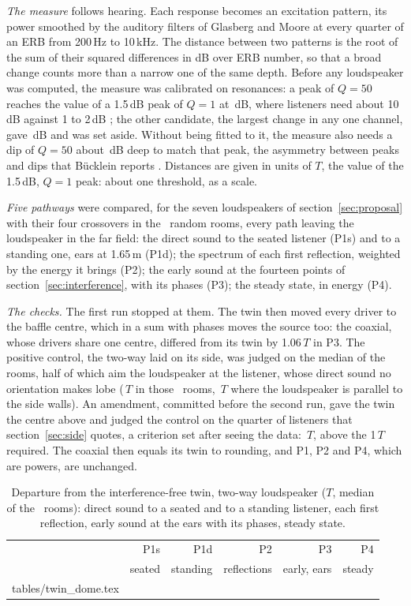 \documentclass[11pt,a4paper]{article}
\makeatletter
\newcommand{\rows}[1]{\@@input tables/#1.tex }
\makeatother
\begin{document}
\emph{The measure} follows hearing. Each response becomes an excitation pattern, its power smoothed by
the auditory filters of Glasberg and Moore \cite{glasberg1990} at every quarter of an ERB from 200\,Hz to
10\,kHz. The distance between two patterns is the root of the sum of their squared differences in dB
over ERB number, so that a broad change counts more than a narrow one of the same depth. Before any
loudspeaker was computed, the measure was calibrated on resonances: a peak of $Q = 50$ reaches the value
of a 1.5\,dB peak of $Q = 1$ at \nslLfiftyA\,dB, where listeners need about 10\,dB against 1 to 2\,dB
\cite{toole1988}; the other candidate, the largest change in any one channel, gave \nslLfiftyB\,dB and
was set aside. Without being fitted to it, the measure also needs a dip of $Q = 50$ about
\nslDipFifty\,dB deep to match that peak, the asymmetry between peaks and dips that Bücklein reports
\cite{bucklein1981}. Distances are given in units of $T$, the value of the 1.5\,dB, $Q = 1$ peak: about
one threshold, as a scale.

\emph{Five pathways} were compared, for the seven loudspeakers of section~\ref{sec:proposal} with their
four crossovers in the \nslRooms\ random rooms, every path leaving the loudspeaker in the far field: the
direct sound to the seated listener (P1s) and to a standing one, ears at 1.65\,m (P1d); the spectrum of
each first reflection, weighted by the energy it brings (P2); the early sound at the fourteen points of
section~\ref{sec:interference}, with its phases (P3); the steady state, in energy (P4).

\emph{The checks.} The first run stopped at them. The twin then moved every driver to the baffle centre,
which in a sum with phases moves the source too: the coaxial, whose drivers share one centre, differed
from its twin by 1.06\,$T$ in P3. The positive control, the two-way laid on its side, was judged on the
median of the rooms, half of which aim the loudspeaker at the listener, whose direct sound no orientation
makes lobe (\nslAimMedian\,$T$ in those \nslAimRooms\ rooms, \nslStraightMedian\,$T$ where the
loudspeaker is parallel to the side walls). An amendment, committed before the second run, gave the twin
the centre above and judged the control on the quarter of listeners that section~\ref{sec:side}
quotes, a criterion set after seeing the data: \nslControl\,$T$, above the 1\,$T$ required.
The coaxial then equals its twin to rounding, and P1, P2 and P4, which are powers, are unchanged.

\begin{table}[t]
\centering
\caption{Departure from the interference-free twin, two-way loudspeaker ($T$, median of the
\nslRooms\ rooms): direct sound to a seated and to a standing listener, each first reflection, early
sound at the ears with its phases, steady state.}
\label{tab:twin}
\small
\begin{tabular}{lrrrrr}
\toprule
& P1s & P1d & P2 & P3 & P4 \\
& seated & standing & reflections & early, ears & steady \\
\midrule
\rows{twin_dome}
\bottomrule
\end{tabular}
\end{table}
\end{document}
